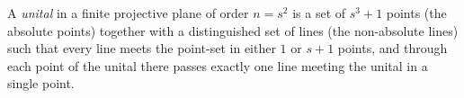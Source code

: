 A \textit{unital} in a finite projective plane of order $n = s^2$ is a set of $s^3 + 1$ points (the absolute points) together with a distinguished set of lines (the non-absolute lines) such that every line meets the point-set in either $1$ or $s+1$ points, and through each point of the unital there passes exactly one line meeting the unital in a single point.
